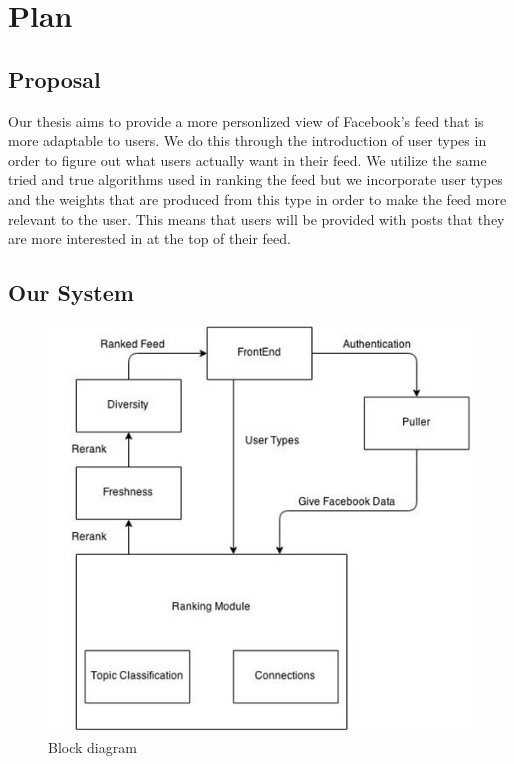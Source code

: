 
\chapter{Plan}\label{ch:plan}

\section{Proposal}

Our thesis aims to provide a more personlized view of Facebook's feed that is more adaptable to users. We do this through the introduction of user types in order to figure out what users actually want in their feed. We utilize the same tried and true algorithms used in ranking the feed but we incorporate user types and the weights that are produced from this type in order to make the feed more relevant to the user. This means that users will be provided with posts that they are more interested in at the top of their feed. 

\section{Our System}

\begin{figure}[bp!]
\centering
\graphicspath{{images/} }
\includegraphics[scale=0.5]{blockdiagram.jpg}
\caption{Block diagram}
\end{figure}

